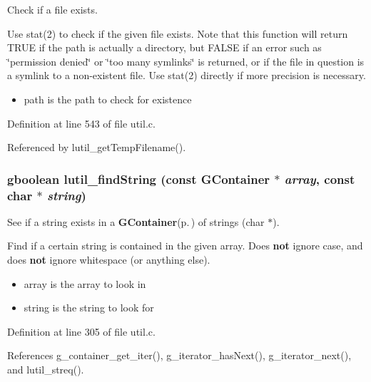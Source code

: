 Check if a file exists. 

Use stat(2) to check if the given file exists. Note that this function will return TRUE if the path is actually a directory, but FALSE if an error such as \char`\"{}permission denied\char`\"{} or \char`\"{}too many symlinks\char`\"{} is returned, or if the file in question is a symlink to a non-existent file. Use stat(2) directly if more precision is necessary.

\begin{itemize}
\item path is the path to check for existence 
\end{itemize}


Definition at line 543 of file util.c.

Referenced by lutil\_\-get\-Temp\-Filename().
\subsubsection{\setlength{\rightskip}{0pt plus 5cm}gboolean lutil\_\-find\-String (const {\bf GContainer} $\ast$ {\em array}, const char $\ast$ {\em string})}\label{util_8h_a18}


See if a string exists in a {\bf GContainer}{\rm (p.\,\pageref{structGContainer})} of strings (char $\ast$). 

Find if a certain string is contained in the given array. Does {\bf not} ignore case, and does {\bf not} ignore whitespace (or anything else).

\begin{itemize}
\item array is the array to look in \item string is the string to look for 
\end{itemize}


Definition at line 305 of file util.c.

References g\_\-container\_\-get\_\-iter(), g\_\-iterator\_\-has\-Next(), g\_\-iterator\_\-next(), and lutil\_\-streq().

